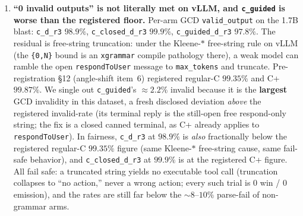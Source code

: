 \begin{enumerate}[leftmargin=*]
\item \textbf{``0 invalid outputs'' is not literally met on vLLM, and \texttt{c\_guided} is worse than the registered floor.} Per-arm GCD \texttt{valid\_output} on the 1.7B blast: \texttt{c\_d\_r3} \(98.9\%\), \texttt{c\_closed\_d\_r3} \(99.9\%\), \texttt{c\_guided\_d\_r3} \(97.8\%\). The residual is free-string truncation: under the Kleene-\(\ast\) free-string rule on vLLM (the \texttt{\{0,N\}} bound is an \texttt{xgrammar} compile pathology there), a weak model can ramble the open \texttt{respondToUser} message to \texttt{max\_tokens} and truncate. Pre-registration \S12 (angle-shift item~6) registered regular-C \(99.35\%\) and C+ \(99.87\%\). We single out \texttt{c\_guided}'s \(\approx\!2.2\%\) invalid because it is the \textbf{largest} GCD invalidity in this dataset, a fresh disclosed deviation \emph{above} the registered invalid-rate (its terminal reply is the still-open free respond-only string; the fix is a closed canned terminal, as C+ already applies to \texttt{respondToUser}). In fairness, \texttt{c\_d\_r3} at \(98.9\%\) is \emph{also} fractionally below the registered regular-C \(99.35\%\) figure (same Kleene-\(\ast\) free-string cause, same fail-safe behavior), and \texttt{c\_closed\_d\_r3} at \(99.9\%\) is at the registered C+ figure. All fail safe: a truncated string yields no executable tool call (truncation collapses to ``no action,'' never a wrong action; every such trial is \(0\) win / \(0\) emission), and the rates are still far below the \(\sim\!8\text{--}10\%\) parse-fail of non-grammar arms.


\end{enumerate}
